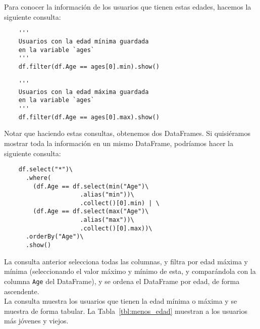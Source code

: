 \documentclass[12pt,a4paper,twoside,openright,titlepage,final]{article}
\begin{document}
\begin{enumerate}
	Para conocer la información de los usuarios que tienen estas edades, hacemos la siguiente consulta:
	
	\begin{verbatim}
	''' 
	Usuarios con la edad mínima guardada 
	en la variable `ages` 
	'''
	df.filter(df.Age == ages[0].min).show()
	
	''' 
	Usuarios con la edad máxima guardada 
	en la variable `ages` 
	'''
	df.filter(df.Age == ages[0].max).show()
	\end{verbatim}
	
	Notar que haciendo estas consultas, obtenemos dos DataFrames. Si quisiéramos mostrar toda la información en un mismo DataFrame, podríamos hacer la siguiente consulta:
	
	\begin{verbatim}
	df.select("*")\
	  .where(
	    (df.Age == df.select(min("Age")\
	                 .alias("min"))\
	                 .collect()[0].min) | \ 
	    (df.Age == df.select(max("Age")\
	                 .alias("max"))\
	                 .collect()[0].max))\
	  .orderBy("Age")\
	  .show()
	\end{verbatim}
	
	La consulta anterior selecciona todas las columnas, y filtra por edad máxima y mínima (seleccionando el valor máximo y mínimo de esta, y comparándola con la columna \texttt{Age} del DataFrame), y se ordena el DataFrame por edad, de forma ascendente.\\
	
	La consulta muestra los usuarios que tienen la edad mínima o máxima y se muestra de forma tabular. La Tabla~\ref{tbl:menos_edad} muestran a los usuarios más jóvenes y viejos.\\  
\end{enumerate}
\end{document}
